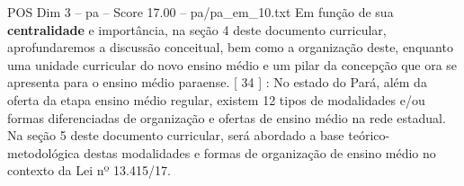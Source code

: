 \begin{textsample}{POS Dim 3 – pa – Score 17.00 – pa/pa\_em\_10.txt}
Em função de sua \textbf{centralidade} e importância, na seção 4 deste documento curricular, aprofundaremos a discussão conceitual, bem como a organização deste, enquanto uma unidade curricular do novo ensino médio e um pilar da concepção que ora se apresenta para o ensino médio paraense. [ 34 ] : No estado do Pará, além da oferta da etapa ensino médio regular, existem 12 tipos de modalidades e/ou formas diferenciadas de organização e ofertas de ensino médio na rede estadual.
Na seção 5 deste documento curricular, será abordado a base teórico-metodológica destas modalidades e formas de organização de ensino médio no contexto da Lei nº 13.415/17.

\end{textsample}
